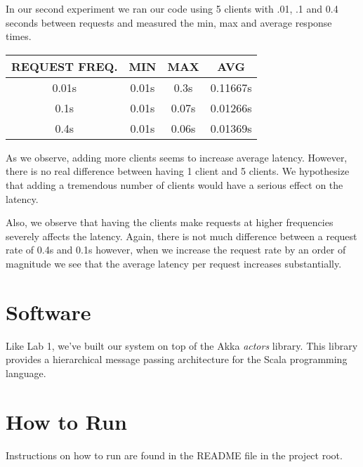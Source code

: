 \documentclass[11pt]{article}
\begin{document}
In our second experiment we ran our code using 5 clients with .01, .1
and 0.4 seconds between requests and measured the min, max and
average response times.


\begin{tabular}{c|c|c|c}
  REQUEST FREQ. & MIN & MAX & AVG \\
  \hline
  0.01s & 0.01s & 0.3s  & 0.11667s \\
  0.1s  & 0.01s & 0.07s & 0.01266s \\
  0.4s  & 0.01s & 0.06s & 0.01369s \\
\end{tabular}

As we observe, adding more clients seems to increase average
latency.  However, there is no real difference between having 1 client
and 5 clients.  We hypothesize that adding a tremendous number of
clients would have a serious effect on the latency.

Also, we observe that having the clients make requests at higher
frequencies severely affects the latency.  Again, there is not much
difference between a request rate of 0.4s and 0.1s however, when we
increase the request rate by an order of magnitude we see that the
average latency per request increases substantially.

\section{Software}
Like Lab 1, we've built our system on top of the Akka \emph{actors}
library.  This library provides a hierarchical message passing
architecture for the Scala programming language.

\section{How to Run}
Instructions on how to run are found in the README file in the project root.
\end{document}
